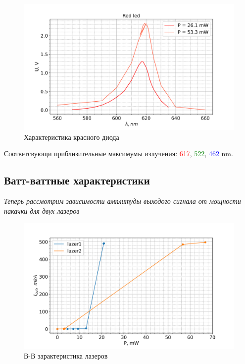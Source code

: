 \documentclass[a4paper]{article}
\begin{document}
        \begin{figure}[H]
            \begin{center}
                \includegraphics[scale=0.5]{spectr_red_led.png}
                \caption{Характеристика красного диода}
                \label{red}
            \end{center}
        \end{figure}
        
        \par Соответсвующи приблизительные максимумы излучения: \textcolor{red}{617}, \textcolor{green}{522}, \textcolor{blue}{462} nm.

	
	\subsection{Ватт-ваттные характеристики}
	
        \par \textit{Теперь рассмотрим зависимости амплитуды выходого сигнала от мощности накачки для двух лазеров}
        
        \begin{figure}[H]
            \begin{center}
                \includegraphics[scale=0.5]{WW-laser.png}
                \caption{В-В зарактеристика лазеров}
                \label{W-W-lasers}
            \end{center}
        \end{figure}
        
\end{document}
